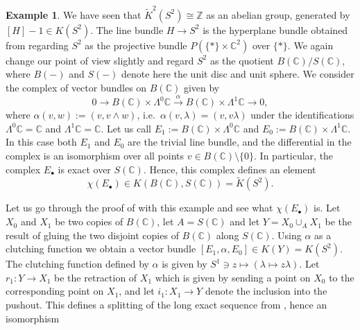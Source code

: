 \documentclass[12pt,a4paper]{amsart}
\theoremstyle{plain}
\theoremstyle{definition}
\newtheorem{exmp}[thm]{Example}
\theoremstyle{remark}
\begin{document}
\begin{exmp}
  We have seen that $\tilde{K}^{2}(S^{2}) \cong \mathbb{Z}$ as an abelian group, generated by $[H] - 1 \in K(S^{2})$.
  The line bundle $H \to S^{2}$ is the hyperplane bundle obtained from regarding $S^{2}$ as the projective bundle $P(\{ * \} \times \mathbb{C}^{2})$ over $\{ * \}$.
  We again change our point of view slightly and regard $S^{2}$ as the quotient $B(\mathbb{C})/S(\mathbb{C})$, where $B(-)$ and $S(-)$ denote here the unit disc and unit sphere.
  We consider the complex of vector bundles on $B(\mathbb{C})$ given by
  \[ 0 \to B(\mathbb{C}) \times \Lambda^{0}\mathbb{C} \xrightarrow{\alpha} B(\mathbb{C}) \times \Lambda^{1}\mathbb{C} \to 0, \]
  where $\alpha(v,w) := (v,v \wedge w)$, i.e.~$\alpha(v, \lambda) = (v, v \lambda)$ under the identifications $\Lambda^{0}\mathbb{C} = \mathbb{C}$ and $\Lambda^{1}\mathbb{C} = \mathbb{C}$.
  Let us call $E_{1} := B(\mathbb{C}) \times \Lambda^{0}\mathbb{C}$ and $E_{0} := B(\mathbb{C}) \times \Lambda^{1} \mathbb{C}$.
  In this case both $E_{1}$ and $E_{0}$ are the trivial line bundle, and the differential in the complex is an isomorphism over all points $v \in B(\mathbb{C}) \setminus \{0 \}$.
  In particular, the complex $E_{\bullet}$ is exact over $S(\mathbb{C})$.
  Hence, this complex defines an element
  \[ \chi(E_{\bullet}) \in K(B(\mathbb{C}),S(\mathbb{C})) = \tilde{K}(S^{2}). \]

  Let us go through the proof of \cite[Lemma 2.6.7]{ati67} with this example and see what $\chi(E_{\bullet})$ is.
  Let $X_{0}$ and $X_{1}$ be two copies of $B(\mathbb{C})$, let $A = S(\mathbb{C})$ and let $Y = X_{0} \cup_{A} X_{1}$ be the result of gluing the two disjoint copies of $B(\mathbb{C})$ along $S(\mathbb{C})$.
  Using $\alpha$ as a clutching function we obtain a vector bundle $[E_{1}, \alpha, E_{0}] \in K(Y) = K(S^{2})$.
  The clutching function defined by $\alpha$ is given by $S^{1} \ni z \mapsto (\lambda \mapsto z \lambda)$.
  Let $r_{1} \colon Y \to X_{1}$ be the retraction of $X_{1}$ which is given by sending a point on $X_{0}$ to the corresponding point on $X_{1}$, and let $i_{1} \colon X_{1} \to Y$ denote the inclusion into the pushout.
  This defines a splitting of the long exact sequence from \cite[Proposition 2.4.4]{ati67}, hence an isomorphism
  

\end{exmp}
\end{document}
